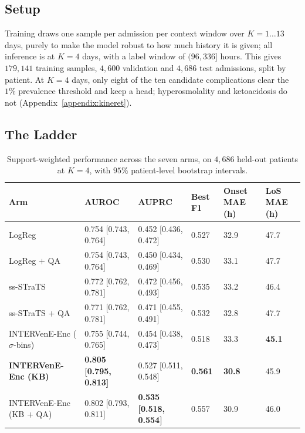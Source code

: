\subsection{Setup}

Training draws one sample per admission per context window over $K = 1\ldots13$ days, purely to make the model robust to how much history it is given; all inference is at $K = 4$ days, with a label window of $(96, 336]$ hours. This gives $179{,}141$ training samples, $4{,}600$ validation and $4{,}686$ test admissions, split by patient. At $K = 4$ days, only eight of the ten candidate complications clear the $1\%$ prevalence threshold and keep a head; hyperosmolality and ketoacidosis do not (Appendix~\ref{appendix:kineret}).

\subsection{The Ladder}

\begin{table}[htbp]
\centering
\singlespacing
\caption{Support-weighted performance across the seven arms, on $4{,}686$ held-out patients at $K = 4$, with $95\%$ patient-level bootstrap intervals.}
\label{tab:kineret-ladder-results}
\small
\setlength{\tabcolsep}{4pt}
\begin{tabular}{llllll}
\toprule
Arm & AUROC & AUPRC & Best F1 & Onset MAE (h) & LoS MAE (h) \\
\midrule
LogReg                     & 0.754 [0.743, 0.764] & 0.452 [0.436, 0.472] & 0.527 & 32.9 & 47.7 \\
LogReg $+$ QA              & 0.754 [0.743, 0.764] & 0.450 [0.434, 0.469] & 0.530 & 33.1 & 47.7 \\
ss-STraTS                  & 0.772 [0.762, 0.781] & 0.472 [0.456, 0.493] & 0.535 & 33.2 & 46.4 \\
ss-STraTS $+$ QA           & 0.771 [0.762, 0.781] & 0.471 [0.455, 0.491] & 0.532 & 32.8 & 47.7 \\
INTERVenE-Enc ($\sigma$-bins) & 0.755 [0.744, 0.765] & 0.454 [0.438, 0.473] & 0.518 & 33.3 & \textbf{45.1} \\
\textbf{INTERVenE-Enc (KB)}   & \textbf{0.805 [0.795, 0.813]} & 0.527 [0.511, 0.548] & \textbf{0.561} & \textbf{30.8} & 45.9 \\
INTERVenE-Enc (KB $+$ QA)     & 0.802 [0.793, 0.811] & \textbf{0.535 [0.518, 0.554]} & 0.557 & 30.9 & 46.0 \\
\bottomrule
\end{tabular}
\end{table}

